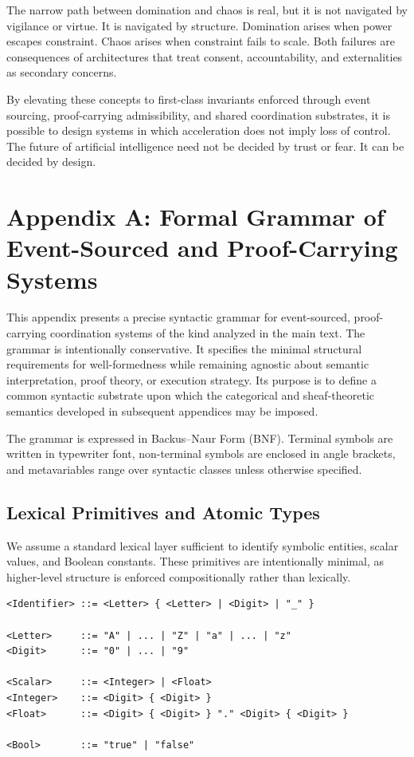 \documentclass[11pt,oneside]{article}
\begin{document}
The narrow path between domination and chaos is real, but it is not navigated by vigilance or virtue. It is navigated by structure. Domination arises when power escapes constraint. Chaos arises when constraint fails to scale. Both failures are consequences of architectures that treat consent, accountability, and externalities as secondary concerns.

By elevating these concepts to first-class invariants enforced through event sourcing, proof-carrying admissibility, and shared coordination substrates, it is possible to design systems in which acceleration does not imply loss of control. The future of artificial intelligence need not be decided by trust or fear. It can be decided by design.

\newpage
\appendix

\section{Appendix A: Formal Grammar of Event-Sourced and Proof-Carrying Systems}

This appendix presents a precise syntactic grammar for event-sourced, proof-carrying coordination systems of the kind analyzed in the main text. The grammar is intentionally conservative. It specifies the minimal structural requirements for well-formedness while remaining agnostic about semantic interpretation, proof theory, or execution strategy. Its purpose is to define a common syntactic substrate upon which the categorical and sheaf-theoretic semantics developed in subsequent appendices may be imposed.

The grammar is expressed in Backus–Naur Form (BNF). Terminal symbols are written in typewriter font, non-terminal symbols are enclosed in angle brackets, and metavariables range over syntactic classes unless otherwise specified.

\subsection{Lexical Primitives and Atomic Types}

We assume a standard lexical layer sufficient to identify symbolic entities, scalar values, and Boolean constants. These primitives are intentionally minimal, as higher-level structure is enforced compositionally rather than lexically.

\begin{verbatim}
<Identifier> ::= <Letter> { <Letter> | <Digit> | "_" }

<Letter>     ::= "A" | ... | "Z" | "a" | ... | "z"
<Digit>      ::= "0" | ... | "9"

<Scalar>     ::= <Integer> | <Float>
<Integer>    ::= <Digit> { <Digit> }
<Float>      ::= <Digit> { <Digit> } "." <Digit> { <Digit> }

<Bool>       ::= "true" | "false"
\end{verbatim}
\end{document}
